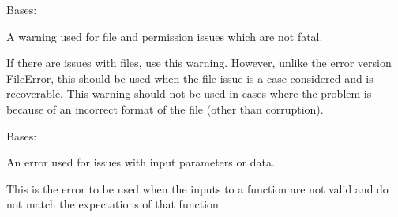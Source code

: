 \documentclass[letterpaper,11pt,english]{sphinxmanual}
\begin{document}
\begin{savenotes}\begin{fulllineitems}
\label{\detokenize{code/lezargus.library.logging:lezargus.library.logging.FileWarning}}
\pysigstartsignatures
{}
\pysigstopsignatures
\sphinxAtStartPar
Bases: {\hyperref[\detokenize{code/lezargus.library.logging:lezargus.library.logging.LezargusWarning}]{}}

\sphinxAtStartPar
A warning used for file and permission issues which are not fatal.

\sphinxAtStartPar
If there are issues with files, use this warning. However, unlike the
error version FileError, this should be used when the file issue is
a case considered and is recoverable. This warning should not be
used in cases where the problem is because of an incorrect format of the
file (other than corruption).

\end{fulllineitems}\end{savenotes}


\begin{savenotes}\begin{fulllineitems}
\label{\detokenize{code/lezargus.library.logging:lezargus.library.logging.InputError}}
\pysigstartsignatures
{}
\pysigstopsignatures
\sphinxAtStartPar
Bases: {\hyperref[\detokenize{code/lezargus.library.logging:lezargus.library.logging.LezargusError}]{}}

\sphinxAtStartPar
An error used for issues with input parameters or data.

\sphinxAtStartPar
This is the error to be used when the inputs to a function are not valid
and do not match the expectations of that function.

\end{fulllineitems}\end{savenotes}

\end{document}
